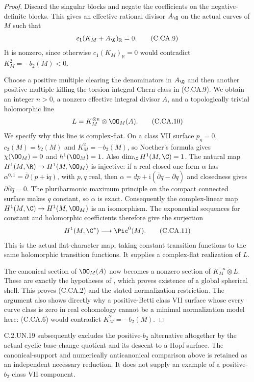 \begin{proof}
Discard the singular blocks and negate the coefficients
on the negative-definite blocks. This gives an effective
rational divisor $A_{\Q}$ on the actual curves of $M$
such that
\[
                   c_1(K_M+A_{\Q})_{\mathbb R}=0.        \tag{C.CA.9}
\]
It is nonzero, since otherwise $c_1(K_M)_{\mathbb R}=0$
would contradict $K_M^2=-b_2(M)<0$.

Choose a positive multiple clearing the denominators in
$A_{\Q}$ and then another positive multiple killing the
torsion integral Chern class in (C.CA.9). We obtain an
integer $n>0$, a nonzero effective integral divisor $A$,
and a topologically trivial holomorphic line
\[
                       L=K_M^{\otimes n}\otimes\OO_M(A).
                                                               \tag{C.CA.10}
\]
We specify why this line is complex-flat. On a class VII
surface $p_g=0$, $c_2(M)=b_2(M)$ and $K_M^2=-b_2(M)$,
so Noether's formula gives $\chi(\OO_M)=0$ and
$h^1(\OO_M)=1$. Also $\dim_{\C}H^1(M,\C)=1$.
The natural map $H^1(M,\R)\to H^1(M,\OO_M)$ is
injective: if a real closed one-form $\alpha$ has
$\alpha^{0,1}=\bar\partial(p+\mathrm i q)$, with $p,q$
real, then
$\alpha=dp+\mathrm i(\bar\partial q-\partial q)$ and
closedness gives $\partial\bar\partial q=0$. The
pluriharmonic maximum principle on the compact connected
surface makes $q$ constant, so $\alpha$ is exact.
Consequently the complex-linear map
$H^1(M,\C)\to H^1(M,\OO_M)$ is an isomorphism.
The exponential sequences for constant and holomorphic
coefficients therefore give the surjection
\[
             H^1(M,\C^*)\longrightarrow\Pic^0(M).       \tag{C.CA.11}
\]
This is the actual flat-character map, taking constant
transition functions to the same holomorphic transition
functions. It supplies a complex-flat realization of $L$.

The canonical section of $\OO_M(A)$ now becomes a
nonzero section of $K_M^{-n}\otimes L$. These are exactly
the hypotheses of \cite[Theorem~0.2]{Dloussky2006},
which proves existence of a global spherical shell.
This proves (C.CA.2) and the stated normalization
restriction. The argument also shows directly why a
positive-Betti class VII surface whose every curve class
is zero in real cohomology cannot be a minimal
normalization model here: (C.CA.6) would contradict
$K_M^2=-b_2(M)$.
\end{proof}

C.2.UN.19 subsequently excludes the positive-$b_2$ alternative
altogether by the actual cyclic base-change quotient and its
descent to a Hopf surface. The canonical-support and
numerically anticanonical comparison above is retained as an
independent necessary reduction. It does not supply an example
of a positive-$b_2$ class VII component.
